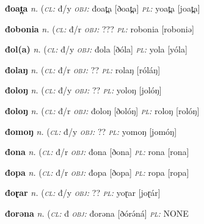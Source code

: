 \newentry
\headword\textbf{đoat̪a}  
\ipa{[ðoat̪a]}
\synpos\textit{n.} 
\class(\textit{\textsc{cl:}} {đ/y}
\object\textit{\textsc{obj:}} đoat̪a [ðoat̪a]
\plural\textit{\textsc{pl:}} yoat̪a [joat̪a]


\newentry
\headword\textbf{đobonia}  
\ipa{[ðoboniə]}
\synpos\textit{n.} 
\class(\textit{\textsc{cl:}} {đ/r}
\object\textit{\textsc{obj:}} ???
\plural\textit{\textsc{pl:}} robonia [roboniə]

\newentry
\headword\textbf{đol(a)}  
\ipa{[ðól(a)]}
\synpos\textit{n.} 
\class(\textit{\textsc{cl:}} {đ/y}
\object\textit{\textsc{obj:}} đola [ðóla]
\plural\textit{\textsc{pl:}} yola [yóla]


\newentry
\headword\textbf{đolaŋ}  
\ipa{[ðóláŋ]}
\synpos\textit{n.} 
\class(\textit{\textsc{cl:}} {đ/r}
\object\textit{\textsc{obj:}} ??
\plural\textit{\textsc{pl:}} rolaŋ [róláŋ]

\newentry
\headword\textbf{đoloŋ}  
\ipa{[ðolóŋ]}
\synpos\textit{n.} 
\class(\textit{\textsc{cl:}} {đ/y}
\object\textit{\textsc{obj:}} ??
\plural\textit{\textsc{pl:}} yoloŋ [jolóŋ]

\newentry
\headword\textbf{đoloŋ}  
\ipa{[ðólóŋ]}
\synpos\textit{n.} 
\class(\textit{\textsc{cl:}} {đ/r}
\object\textit{\textsc{obj:}} đoloŋ [ðolóŋ]
\plural\textit{\textsc{pl:}} roloŋ [rolóŋ]

\newentry
\headword\textbf{đomoŋ}  
\ipa{[ðomóŋ]}
\synpos\textit{n.} 
\class(\textit{\textsc{cl:}} {đ/y}
\object\textit{\textsc{obj:}} ??
\plural\textit{\textsc{pl:}} yomoŋ [jomóŋ]


\newentry
\headword\textbf{đona}  
\ipa{[ðona]}
\synpos\textit{n.} 
\class(\textit{\textsc{cl:}} {đ/r}
\object\textit{\textsc{obj:}} đona [ðona]
\plural\textit{\textsc{pl:}} rona [rona]


\newentry
\headword\textbf{đopa}  
\ipa{[ðopa]}
\synpos\textit{n.} 
\class(\textit{\textsc{cl:}} {đ/r}
\object\textit{\textsc{obj:}} đopa [ðopa]
\plural\textit{\textsc{pl:}} ropa [ropa]

\newentry
\headword\textbf{đoɽar}  
\ipa{[ðoɽár]}
\synpos\textit{n.} 
\class(\textit{\textsc{cl:}} {đ/y}
\object\textit{\textsc{obj:}} ??
\plural\textit{\textsc{pl:}} yoɽar [joɽár]

\newentry
\headword\textbf{đorəna}  
\ipa{[ðórə́ná]}
\synpos\textit{n.} 
\class(\textit{\textsc{cl:}} {đ}
\object\textit{\textsc{obj:}} đorəna [ðórə́ná]
\plural\textit{\textsc{pl:}} NONE


